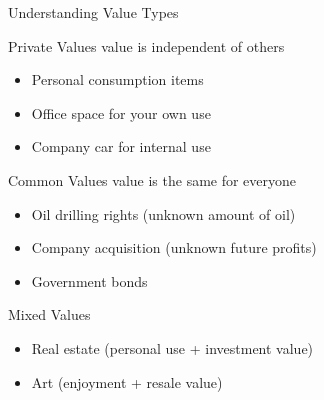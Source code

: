\documentclass[xcolor={x11names}]{beamer}
\begin{document}
\begin{frame}{Understanding Value Types}

\begin{block}{Private Values value is independent of others}
\begin{itemize}
  \item Personal consumption items
  \item Office space for your own use
  \item Company car for internal use
\end{itemize}
\end{block}

\begin{block}{Common Values value is the same for everyone}
\begin{itemize}
  \item Oil drilling rights (unknown amount of oil)
  \item Company acquisition (unknown future profits)
  \item Government bonds
\end{itemize}
\end{block}

\begin{block}{Mixed Values}
\begin{itemize}
  \item Real estate (personal use + investment value)
  \item Art (enjoyment + resale value)
\end{itemize}
\end{block}
\end{frame}
\end{document}
